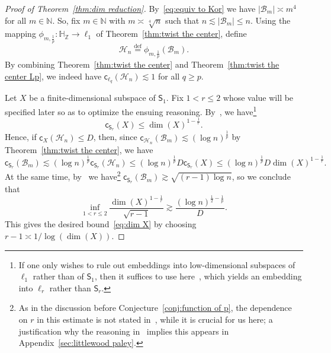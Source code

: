 \documentclass[11pt,reqno]{amsart}
\renewcommand{\H}{\mathbb{H}}
\newcommand{\N}{\mathbb{N}}
\newcommand{\Z}{\mathbb{Z}}
\newcommand{\cc}{{\mathsf{c}}}
\newcommand{\0}{\mathbf{0}}
\renewcommand{\1}{\mathbf 1}
\newcommand{\from}{\colon}
\newcommand{\eqdef}{\stackrel{\mathrm{def}}{=}}
\renewcommand{\ge}{\geqslant}
\renewcommand{\le}{\leqslant}
\theoremstyle{remark}
\begin{document}
\begin{proof}[Proof of Theorem~\ref{thm:dim reduction}]By~\eqref{eq:equiv to Kor} we have $|\mathcal{B}_m|\asymp m^4$ for all $m\in \N$. So, fix $m\in \N$ with $m\asymp{\sqrt[4]{n}}$ such that $n\lesssim |\mathcal{B}_m|\le n$. Using the mapping $\phi_{m,\frac{1}{p}}\from \H_\Z\to\ell_1$ of Theorem~\ref{thm:twist the center}, define
$$
\mathscr{H}_n\eqdef \phi_{m,\frac{1}{p}}(\mathcal{B}_m).
$$
By combining Theorem~\ref{thm:twist the center} and Theorem~\ref{thm:twist the center Lp}, we indeed have  $\cc_{\ell_q}(\mathscr{H}_n)\lesssim 1$ for all $q\ge p$.

Let $X$ be a finite-dimensional subspace of $\mathsf{S}_1$. Fix $1<r\le 2$  whose value will be specified later so as to optimize the ensuing reasoning. By~\cite[Theorem~12]{NPS18}, we have\footnote{If one only wishes to rule out embeddings into low-dimensional subspaces of $\ell_1$ rather than of $\mathsf{S}_1$, then it suffices to use here~\cite[Theorem~1.2]{LT80}, which yields an embedding into $\ell_r$ rather than $\mathsf{S}_r$.}
$$
\cc_{\mathsf{S}_r}(X)\le \dim(X)^{1-\frac{1}{r}}.
$$
Hence, if $\cc_X(\mathscr{H}_n)\le D$, then, since $\cc_{\mathscr{H}_n}(\mathcal{B}_m)\lesssim (\log n)^{\frac{1}{p}}$ by Theorem~\ref{thm:twist the center}, we have
$$
\cc_{\mathsf{S}_r}(\mathcal{B}_m)\lesssim (\log n)^{\frac{1}{p}}\cc_{\mathsf{S}_r}(\mathscr{H}_n)\le (\log n)^{\frac{1}{p}}D\cc_{\mathsf{S}_r}(X)\le (\log n)^{\frac{1}{p}}D\dim(X)^{1-\frac{1}{r}}.
$$
At the same time, by~\cite{LafforgueNaor} we have\footnote{As in the discussion before Conjecture~\ref{conj:function of p}, the dependence on $r$ in this estimate is not stated in~\cite{LafforgueNaor}, while it is crucial for us here; a justification why the reasoning in~\cite{LafforgueNaor} implies   this appears in Appendix~\ref{sec:littlewood paley}.} $\cc_{\mathsf{S}_r}(\mathcal{B}_m)\gtrsim \sqrt{(r-1)\log n}$, so we conclude that
$$
\inf_{1<r\le 2}\frac{\dim(X)^{1-\frac{1}{r}}}{\sqrt{r-1}}\gtrsim \frac{(\log n)^{\frac12-\frac1{p}}}{D}.
$$
This gives the desired bound~\eqref{eq:dim X} by choosing $r-1\asymp 1/\log(\dim(X))$.
\end{proof}
\end{document}
